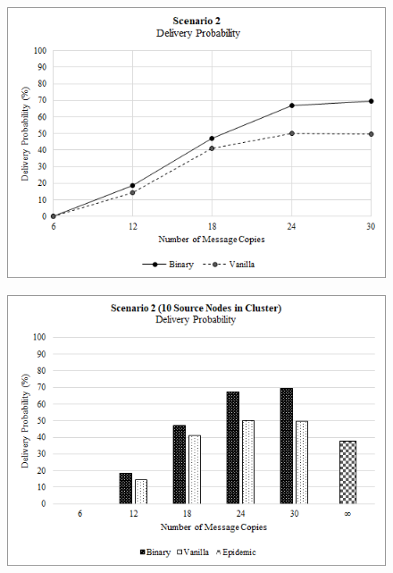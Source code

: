 \documentclass{article}
\begin{document}
\begin{figure}[h!]

\captionsetup{justification=centering, font=footnotesize}

\centering
\begin{minipage}[t]{.5\textwidth}
  \centering
  \includegraphics[width=.98\linewidth]{Results/Graphs/DeliveryProbability/S2_DeliveryProbability_SprayAndWaitComparison.png}
  \label{fig:test1}
\end{minipage}%
\begin{minipage}[t]{.5\textwidth}
  \centering
  \includegraphics[width=.98\linewidth]{Results/Graphs/DeliveryProbability/S2_DeliveryProbability_AllComparison.png}
  \label{fig:test2}
\end{minipage}


\end{figure}
\end{document}

